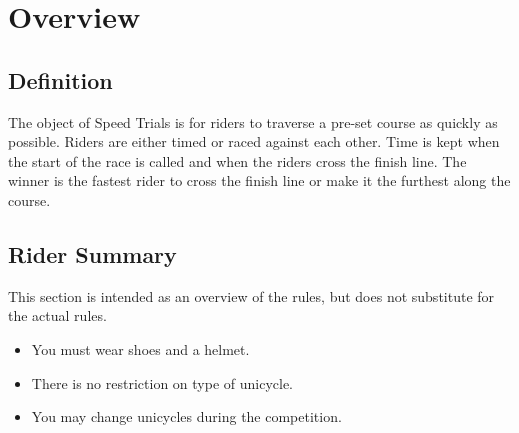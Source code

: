 \chapter{Overview}

\section{Definition}

The object of Speed Trials is for riders to traverse a pre-set course as quickly as possible.
Riders are either timed or raced against each other.
Time is kept when the start of the race is called and when the riders cross the finish line.
The winner is the fastest rider to cross the finish line or make it the furthest along the course.

\section{Rider Summary}

This section is intended as an overview of the rules, but does not substitute for the actual rules.
\begin{itemize}
\item You must wear shoes and a helmet.
\item There is no restriction on type of unicycle.
\item You may change unicycles during the competition.
\end{itemize}
